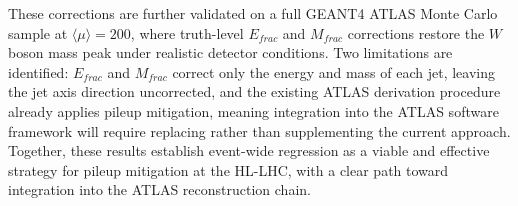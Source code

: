 These corrections are further validated on a full GEANT4 ATLAS Monte Carlo sample at $\langle\mu\rangle=200$, where truth-level $E_{frac}$ and $M_{frac}$ corrections restore the $W$ boson mass peak under realistic detector conditions.
Two limitations are identified: $E_{frac}$ and $M_{frac}$ correct only the energy and mass of each jet, leaving the jet axis direction uncorrected, and the existing ATLAS derivation procedure already applies pileup mitigation, meaning integration into the ATLAS software framework will require replacing rather than supplementing the current approach.
Together, these results establish event-wide regression as a viable and effective strategy for pileup mitigation at the HL-LHC, with a clear path toward integration into the ATLAS reconstruction chain.
